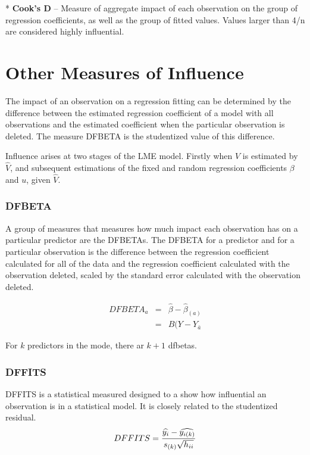 	*  	\textbf{Cook’s D} – Measure of aggregate impact of each observation on the group of regression coefficients, as well as the group of fitted values. Values larger than 4/n are considered highly influential.
	
	
	
\section{Other Measures of Influence}
The impact of an observation on a regression fitting can be determined by the difference between the estimated regression coefficient of a model with all observations and the estimated coefficient when the particular observation is deleted. The measure DFBETA is the studentized value of this difference.

Influence arises at two stages of the LME model. Firstly when $V$ is estimated by $\hat{V}$, and subsequent
estimations of the fixed and random regression coefficients $\beta$ and $u$, given $\hat{V}$.



\subsubsection{DFBETA}
A group of measures that measures how much impact each observation has on a particular predictor are the DFBETAs. The DFBETA for a predictor and for a particular observation is the difference between the regression coefficient calculated for all of the data and the regression coefficient calculated with the observation deleted,  scaled by the standard error calculated with the observation deleted.

\begin{eqnarray}
DFBETA_{a} &=& \hat{\beta} - \hat{\beta}_{(a)} \\
&=& B(Y-Y_{\bar{a}}
\end{eqnarray}

For $k$ predictors in the mode, there ar $k+1$ dfbetas.



\subsubsection{DFFITS} %
DFFITS is a statistical measured designed to a show how influential an observation is in a statistical model. It is closely related to the studentized residual.
\begin{displaymath} DFFITS = {\widehat{y_i} -
	\widehat{y_{i(k)}} \over s_{(k)} \sqrt{h_{ii}}} \end{displaymath}


